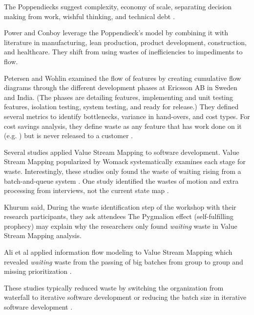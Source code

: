 The Poppendiecks suggest  complexity, economy of scale, separating decision making from work, wishful thinking, and technical debt \cite{PoppendieckResultsNotPoint}.

Power and Conboy leverage the Poppendieck's model by combining it with literature in manufacturing, lean production, product development, construction, and healthcare. They shift from using wastes of inefficiencies to impediments to flow. \cite{PowerImpediments}

Petersen and Wohlin examined the flow of features by creating cumulative flow diagrams through the different development phases at Ericsson AB in Sweden and India. (The phases are detailing features, implementing and unit testing features, isolation testing, system testing, and ready for release.) They defined several metrics to identify bottlenecks, variance in hand-overs, and cost types. For cost savings analysis, they define waste as any feature that has work done on it (e.g. ) but is never released to a customer \cite{Petersen2011}.

Several studies applied Value Stream Mapping to software development. Value Stream Mapping popularized by Womack systematically examines each stage for waste. Interestingly, these studies only found the waste of waiting rising from a batch-and-queue system \cite{Ali2016, Khurum2014, Mujtaba2010}. One study identified the wastes of motion and extra processing from interviews, not the current state map \cite{Mujtaba2010}.

Khurum said,  During the waste identification step of the workshop with their research participants, they ask attendees  \cite{Khurum2014} The Pygmalion effect (self-fulfilling prophecy) may explain why the researchers only found \textit{waiting} waste in Value Stream Mapping analysis.

Ali et al applied information flow modeling to Value Stream Mapping which revealed \textit{waiting} waste from the passing of big batches from group to group and missing prioritization \cite{Ali2016}.

These studies typically reduced waste by switching the organization from waterfall to iterative software development or reducing the batch size in iterative software development \cite{Ali2016, Khurum2014, Mujtaba2010}.
